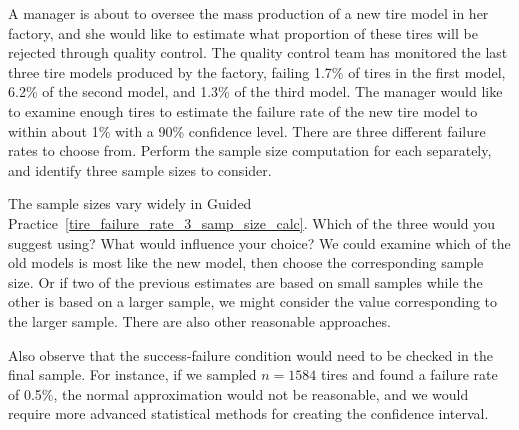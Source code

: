 \begin{exercisewrap}
\begin{nexercise}
\label{tire_failure_rate_3_samp_size_calc}%
A manager is about to oversee the mass
production of a new tire model in her factory,
and she would like to estimate what proportion of
these tires will be rejected through quality control.
The quality control team has monitored the last three
tire models produced by the factory,
failing 1.7\% of tires in the first model,
6.2\% of the second model,
and 1.3\% of the third model.
The manager would like to examine enough tires
to estimate the failure rate of the new tire model
to within about 1\% with a 90\% confidence level.
There are three different failure rates to choose from.
Perform the sample size computation for each separately,
and identify three sample sizes to consider.\footnotemark
\end{nexercise}
\end{exercisewrap}

\begin{examplewrap}
\begin{nexample}{The sample sizes vary widely in
    Guided Practice~\ref{tire_failure_rate_3_samp_size_calc}.
    Which of the three would you suggest using?
    What would influence your choice?}
  We could examine which of the old models is most
  like the new model, then choose the corresponding sample
  size.
  Or if two of the previous estimates are based on small
  samples while the other is based on a larger sample,
  we might consider the value corresponding to the larger
  sample.
  There are also other reasonable approaches.

  Also observe that the success-failure
  condition would need to be checked in the final sample.
  For instance, if we sampled $n = 1584$ tires and found
  a failure rate of 0.5\%, the normal approximation would
  not be reasonable, and we would require more advanced
  statistical methods for creating the confidence interval.
\end{nexample}
\end{examplewrap}

